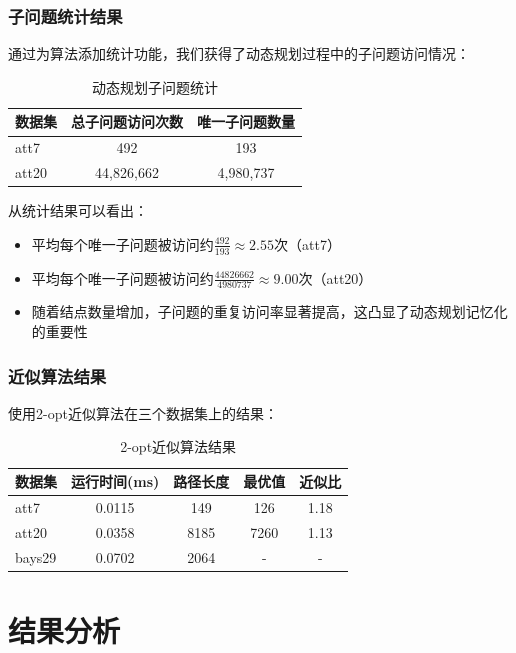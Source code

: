 \documentclass[UTF8,12pt,a4paper]{ctexart}
\begin{document}
\subsubsection{子问题统计结果}

通过为算法添加统计功能，我们获得了动态规划过程中的子问题访问情况：

\begin{table}[H]
	\centering
	\begin{tabular}{lcc}
		\toprule
		数据集 & 总子问题访问次数 & 唯一子问题数量 \\
		\midrule
		att7 & 492 & 193 \\
		att20 & 44,826,662 & 4,980,737 \\
		\bottomrule
	\end{tabular}
	\caption{动态规划子问题统计}
\end{table}

从统计结果可以看出：
\begin{itemize}
	\item 平均每个唯一子问题被访问约$\frac{492}{193} \approx 2.55$次（att7）
	\item 平均每个唯一子问题被访问约$\frac{44826662}{4980737} \approx 9.00$次（att20）
	\item 随着结点数量增加，子问题的重复访问率显著提高，这凸显了动态规划记忆化的重要性
\end{itemize}

\subsubsection{近似算法结果}

使用2-opt近似算法在三个数据集上的结果：

\begin{table}[H]
	\centering
	\begin{tabular}{lcccc}
		\toprule
		数据集 & 运行时间(ms) & 路径长度 & 最优值 & 近似比 \\
		\midrule
		att7 & 0.0115 & 149 & 126 & 1.18 \\
		att20 & 0.0358 & 8185 & 7260 & 1.13 \\
		bays29 & 0.0702 & 2064 & - & - \\
		\bottomrule
	\end{tabular}
	\caption{2-opt近似算法结果}
\end{table}

\newpage
\section{结果分析}
\end{document}
